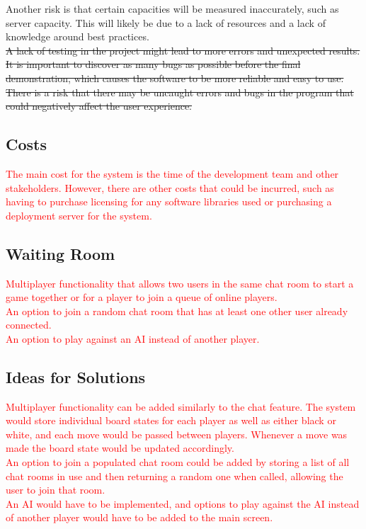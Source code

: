 \documentclass[12pt, titlepage]{article}
\begin{document}
        Another risk is that certain capacities will be measured inaccurately, such as server capacity. This will likely be due to a lack of resources and a lack of knowledge around best practices.\\
        
        \sout{A lack of testing in the project might lead to more errors and unexpected results. It is important to discover as many bugs as possible before the final demonstration, which causes the software to be more reliable and easy to use. There is a risk that there may be uncaught errors and bugs in the program that could negatively affect the user experience.}
        
    \subsection{Costs}
        \textcolor{red}{The main cost for the system is the time of the development team and other stakeholders. However, there are other costs that could be incurred, such as having to purchase licensing for any software libraries used or purchasing a deployment server for the system.}

    \subsection{Waiting Room}
        \textcolor{red}{Multiplayer functionality that allows two users in the same chat room to start a game together or for a player to join a queue of online players.}\\
        
        \textcolor{red}{An option to join a random chat room that has at least one other user already connected.} \\
        
        \textcolor{red}{An option to play against an AI instead of another player.} \\
        
    \subsection{Ideas for Solutions}
        \textcolor{red}{Multiplayer functionality can be added similarly to the chat feature. The system would store individual board states for each player as well as either black or white, and each move would be passed between players. Whenever a move was made the board state would be updated accordingly.} \\
        
        \textcolor{red}{An option to join a populated chat room could be added by storing a list of all chat rooms in use and then returning a random one when called, allowing the user to join that room.}\\
        
        \textcolor{red}{An AI would have to be implemented, and options to play against the AI instead of another player would have to be added to the main screen.}

\newpage    


\end{document}
